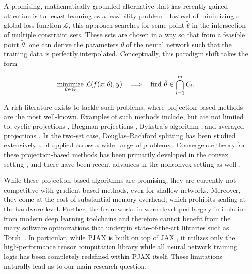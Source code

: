 \documentclass{article}
\DeclareMathOperator*{\minimize}{minimize}
\begin{document}
A promising, mathematically grounded alternative that has recently gained attention is to recast learning as a feasibility problem \cite{elser2019learning, bergmeister2025projection, elser2026learning}. Instead of minimizing a global loss function $\mathcal{L}$, this approach searches for some point $\tilde{\theta}$ in the intersection of multiple constraint sets. These sets are chosen in a way so that from a feasible point $\tilde{\theta}$, one can derive the parameters $\theta$ of the neural network such that the training data is perfectly interpolated. Conceptually, this paradigm shift takes the form
\begin{tcolorbox}
\[
\minimize_{\theta \in \Theta}\, \mathcal{L}(f(x;\theta), y)
\quad \Longrightarrow \quad
\textnormal{find } \tilde{\theta} \in \bigcap_{i=1}^{m} C_i.
\]\end{tcolorbox}
A rich literature exists to tackle such problems, where projection-based methods are the most well-known. Examples of such methods include, but are not limited to, cyclic projections \cite{gubin1967method}, Bregman projections \cite{bregman1967relaxation}, Dykstra's algorithm \cite{dykstra1983algorithm}, and averaged projections \cite{auslender_thesis}. In the two-set case, Douglas--Rachford splitting \cite{douglas1956numerical,eckstein1992douglas} has been studied extensively and applied across a wide range of problems \cite{bauschke2021douglasrachfordalgorithmsolvingpossibly, lindstrom2020surveyyearsdouglasrachford}. Convergence theory for these projection-based methods has been primarily developed in the convex setting \cite{bauschke1996projection}, and there have been recent advances in the nonconvex setting as well \cite{themelis2020douglas,attouch2013convergence,li2016douglas}.

While these projection-based algorithms are promising, they are currently not competitive with gradient-based methods, even for shallow networks. Moreover, they come at the cost of substantial memory overhead, which prohibits scaling at the hardware level. Further, the frameworks in \cite{elser2019learning,bergmeister2025projection} were developed largely in isolation from modern deep learning toolchains and therefore cannot benefit from the many software optimizations that underpin state-of-the-art libraries such as Torch~\cite{paszke2019pytorchimperativestylehighperformance}. In particular, while PJAX \cite{bergmeister2025projection} is built on top of JAX \cite{jax2018github}, it utilizes only the high-performance tensor computation library while all neural network training logic has been completely redefined within PJAX itself. These limitations naturally lead us to our main research question.
\end{document}
